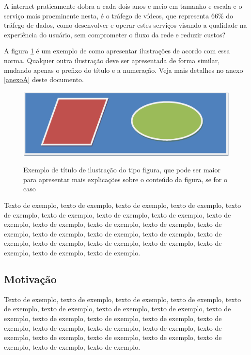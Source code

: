 \documentclass[
	12pt,				%
	oneside,			%
	a4paper,			%
	english,			%
	brazil				%
	]{abntex2ppgsi}
\begin{document}
A internet praticamente dobra a cada dois anos e meio em tamanho e escala e o serviço mais proeminente nesta, é o tráfego de vídeos, que representa 66\% do tráfego de dados, como desenvolver e operar estes serviços visando a qualidade na experiência do usuário, sem comprometer o fluxo da rede e reduzir custos?


A figura \ref{fig:figura-exemplo2} é um exemplo de como apresentar ilustrações de acordo com essa norma. Qualquer outra ilustração deve ser apresentada de forma similar, mudando apenas o prefixo do título e a numeração. Veja mais detalhes no anexo \ref{anexoA} deste documento.

\begin{figure}[htbp]
	\centering
  \caption{Exemplo de título de ilustração do tipo figura, que pode ser maior para apresentar mais explicações sobre o conteúdo da figura, se for o caso}
		\includegraphics{figuras/figura-exemplo.png}
	\label{fig:figura-exemplo2}
\end{figure}

Texto de exemplo, texto de exemplo, texto de exemplo, texto de exemplo, texto de exemplo, texto de exemplo, texto de exemplo, texto de exemplo, texto de exemplo, texto de exemplo, texto de exemplo, texto de exemplo, texto de exemplo, texto de exemplo, texto de exemplo, texto de exemplo, texto de exemplo, texto de exemplo, texto de exemplo, texto de exemplo, texto de exemplo, texto de exemplo, texto de exemplo.

\subsection{Motivação}

Texto de exemplo, texto de exemplo, texto de exemplo, texto de exemplo, texto de exemplo, texto de exemplo, texto de exemplo, texto de exemplo, texto de exemplo, texto de exemplo, texto de exemplo, texto de exemplo, texto de exemplo, texto de exemplo, texto de exemplo, texto de exemplo, texto de exemplo, texto de exemplo, texto de exemplo, texto de exemplo, texto de exemplo, texto de exemplo, texto de exemplo.
\end{document}
